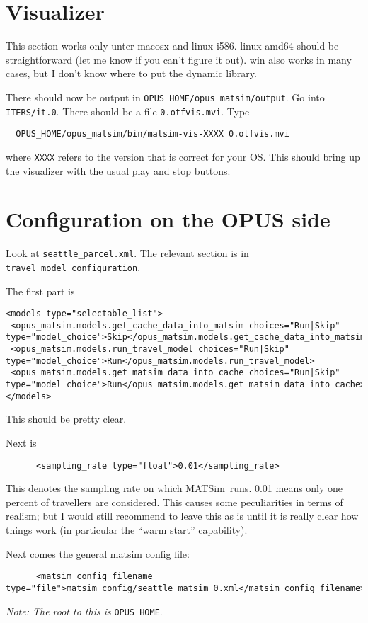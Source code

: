 \documentclass{article}
\def\matsim{MATSim}
\begin{document}
\section{Visualizer}

This section works only unter macosx and linux-i586.  linux-amd64
should be straightforward (let me know if you can't figure it out).
win also works in many cases, but I don't know where to put the
dynamic library.

There should now be output in \verb$OPUS_HOME/opus_matsim/output$.  Go
into \verb$ITERS/it.0$.  There should be a file \verb$0.otfvis.mvi$.
Type
\begin{verbatim}
  OPUS_HOME/opus_matsim/bin/matsim-vis-XXXX 0.otfvis.mvi
\end{verbatim}
where \verb$XXXX$ refers to the version that is correct for your OS.
This should bring up the visualizer with the usual play and stop
buttons.

\section{Configuration on the OPUS side}

Look at \verb$seattle_parcel.xml$. The relevant section is in
\verb$travel_model_configuration$.

The first part is
{\tiny
\begin{verbatim}
<models type="selectable_list">
 <opus_matsim.models.get_cache_data_into_matsim choices="Run|Skip" type="model_choice">Skip</opus_matsim.models.get_cache_data_into_matsim>
 <opus_matsim.models.run_travel_model choices="Run|Skip" type="model_choice">Run</opus_matsim.models.run_travel_model>
 <opus_matsim.models.get_matsim_data_into_cache choices="Run|Skip" type="model_choice">Run</opus_matsim.models.get_matsim_data_into_cache>
</models>
\end{verbatim}
}
This should be pretty clear.

Next is
\begin{verbatim}
      <sampling_rate type="float">0.01</sampling_rate>
\end{verbatim}
This denotes the sampling rate on which \matsim\ runs.  0.01 means
only one percent of travellers are considered.  This causes some
peculiarities in terms of realism; but I would still recommend to
leave this as is until it is really clear how things work (in
particular the ``warm start'' capability).

Next comes the general matsim config file:
{\footnotesize
\begin{verbatim}
      <matsim_config_filename type="file">matsim_config/seattle_matsim_0.xml</matsim_config_filename>
\end{verbatim}
}
\emph{Note: The root to this is} \verb$OPUS_HOME$.
\end{document}
